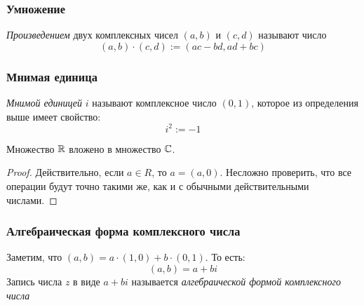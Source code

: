 \subsubsection{Умножение}

\begin{definition}
    \textit{Произведением} двух комплексных чисел $(a, b)$ и $(c, d)$ называют число
    $$
        (a, b) \cdot (c, d) := (ac - bd, ad + bc)
    $$
\end{definition}

\subsubsection{Мнимая единица}

\begin{definition}
    \textit{Мнимой единицей} $i$ называют комплексное число $(0, 1)$, которое из определения выше имеет свойство:
    $$
        i^2 := -1
    $$
\end{definition}

\begin{proposition}
    Множество $\mathbb{R}$ вложено в множество $\mathbb{C}$.
\end{proposition}

\begin{proof}
    Действительно, если $a \in R$, то $a = (a, 0)$. Несложно проверить, что все операции будут точно такими же, как и с обычными действительными числами.
\end{proof}

\subsubsection{Алгебраическая форма комплексного числа}

\begin{definition}
    Заметим, что $(a, b) = a \cdot (1, 0) + b \cdot (0, 1)$. То есть:
    $$
        (a, b) = a + bi
    $$
    Запись числа $z$ в виде $a + bi$ называется \textit{алгебраической формой комплексного числа}
\end{definition}

\begin{center}
\end{center}

